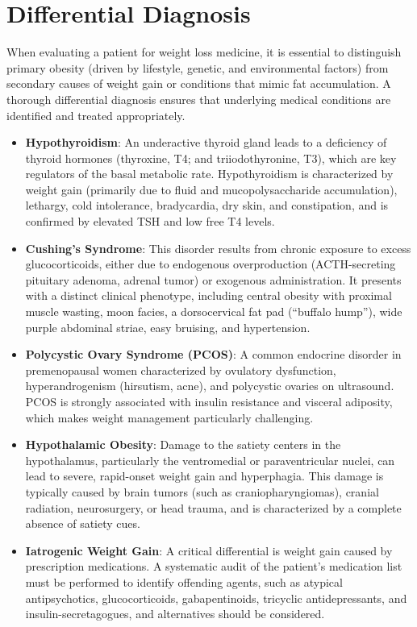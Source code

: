 \section*{Differential Diagnosis}
When evaluating a patient for weight loss medicine, it is essential to distinguish primary obesity (driven by lifestyle, genetic, and environmental factors) from secondary causes of weight gain or conditions that mimic fat accumulation. A thorough differential diagnosis ensures that underlying medical conditions are identified and treated appropriately.

\begin{itemize}
\item \textbf{Hypothyroidism}: An underactive thyroid gland leads to a deficiency of thyroid hormones (thyroxine, T4; and triiodothyronine, T3), which are key regulators of the basal metabolic rate. Hypothyroidism is characterized by weight gain (primarily due to fluid and mucopolysaccharide accumulation), lethargy, cold intolerance, bradycardia, dry skin, and constipation, and is confirmed by elevated TSH and low free T4 levels.
\item \textbf{Cushing's Syndrome}: This disorder results from chronic exposure to excess glucocorticoids, either due to endogenous overproduction (ACTH-secreting pituitary adenoma, adrenal tumor) or exogenous administration. It presents with a distinct clinical phenotype, including central obesity with proximal muscle wasting, moon facies, a dorsocervical fat pad (``buffalo hump''), wide purple abdominal striae, easy bruising, and hypertension.
\item \textbf{Polycystic Ovary Syndrome (PCOS)}: A common endocrine disorder in premenopausal women characterized by ovulatory dysfunction, hyperandrogenism (hirsutism, acne), and polycystic ovaries on ultrasound. PCOS is strongly associated with insulin resistance and visceral adiposity, which makes weight management particularly challenging.
\item \textbf{Hypothalamic Obesity}: Damage to the satiety centers in the hypothalamus, particularly the ventromedial or paraventricular nuclei, can lead to severe, rapid-onset weight gain and hyperphagia. This damage is typically caused by brain tumors (such as craniopharyngiomas), cranial radiation, neurosurgery, or head trauma, and is characterized by a complete absence of satiety cues.
\item \textbf{Iatrogenic Weight Gain}: A critical differential is weight gain caused by prescription medications. A systematic audit of the patient's medication list must be performed to identify offending agents, such as atypical antipsychotics, glucocorticoids, gabapentinoids, tricyclic antidepressants, and insulin-secretagogues, and alternatives should be considered.

\end{itemize}
